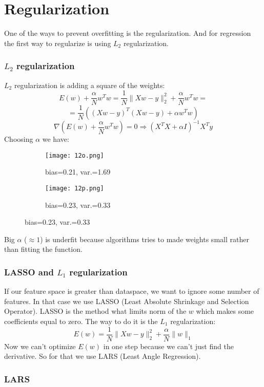 \section{Regularization}

One of the ways to prevent overfitting is the regularization. And for regression the first way to regularize is using $L_2$ regularization.

\subsubsection*{$L_2$ regularization}

$L_2$ regularization is adding a square of the weights:
$$E(w) + \frac{\alpha}{N} w^Tw=\frac{1}{N}\|Xw-y\|_2^2+\frac{\alpha}{N} w^Tw=$$
$$=\frac{1}{N}\left((Xw-y)^T(Xw-y)+\alpha w^Tw\right)$$
$$\nabla \left(E(w)+\frac{\alpha}{N} w^Tw\right)=0\Rightarrow\left(X^TX+\alpha I\right)^{-1}X^Ty$$
Choosing $\alpha$ we have:
\begin{figure}[H]
  \centering
  \begin{subfigure}[c]{0.28\linewidth}
    \texttt{[image: 12o.png]}
    \caption*{bias=0.21, var.=1.69}
  \end{subfigure}
  \hspace{2cm}
  \begin{subfigure}[c]{0.28\linewidth}
    \texttt{[image: 12p.png]}
    \caption*{bias=0.23, var.=0.33}
  \end{subfigure}
  \vspace{-0.4cm}
\end{figure}
Big $\alpha$ ($\approx1$) is underfit because algorithms tries to made weights small rather than fitting the function.

\subsubsection*{LASSO and $L_1$ regularization}

If our feature space is greater than dataspace, we want to ignore some number of features. In that case we use LASSO (Least Absolute Shrinkage and Selection Operator). LASSO is the method what limits norm of the $w$ which makes some coefficients equal to zero. The way to do it is the $L_1$ regularization:
$$E(w)=\frac{1}{N}\|Xw-y\|_2^2+\frac{\alpha}{N}\|w\|_1$$
Now we can't optimize $E(w)$ in one step because we can't just find the derivative. So for that we use LARS (Least Angle Regression).

\subsubsection*{LARS}


